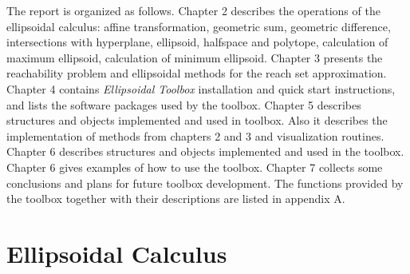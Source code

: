 \documentclass[letterpaper,10pt,english]{sphinxmanual}
\begin{document}
The report is organized as follows. Chapter 2 describes the operations
of the ellipsoidal calculus: affine transformation, geometric sum,
geometric difference, intersections with hyperplane, ellipsoid,
halfspace and polytope, calculation of maximum ellipsoid, calculation of
minimum ellipsoid. Chapter 3 presents the reachability problem and
ellipsoidal methods for the reach set approximation. Chapter 4 contains
\emph{Ellipsoidal Toolbox} installation and quick start instructions, and
lists the software packages used by the toolbox. Chapter 5 describes
structures and objects implemented and used in toolbox. Also it
describes the implementation of methods from chapters 2 and 3 and
visualization routines. Chapter 6 describes structures and objects
implemented and used in the toolbox. Chapter 6 gives examples of how to
use the toolbox. Chapter 7 collects some conclusions and plans for
future toolbox development. The functions provided by the toolbox
together with their descriptions are listed in appendix A.


\chapter{Ellipsoidal Calculus}
\label{chap_ellcalc:ellipsoidal-calculus}\label{chap_ellcalc::doc}
\end{document}
